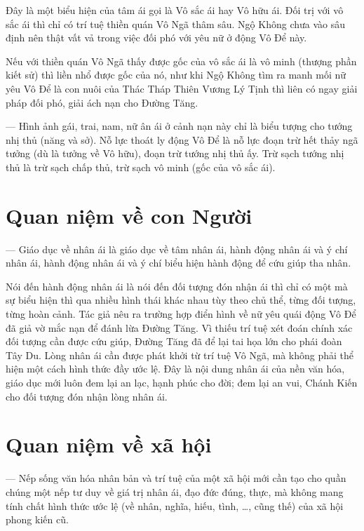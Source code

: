 Đây là một biểu hiện của tâm ái gọi là Vô sắc ái hay Vô hữu ái. Đối trị với vô sắc ái thì chỉ có trí tuệ thiền quán Vô Ngã thâm sâu. Ngộ Không chưa vào sâu định nên thật vất vả trong việc đối phó với yêu nữ ở động Vô Để này.

Nếu với thiền quán Vô Ngã thấy được gốc của vô sắc ái là vô minh (thượng phần kiết sử) thì liền nhổ được gốc của nó, như khi Ngộ Không tìm ra manh mối nữ yêu Vô Để là con nuôi của Thác Tháp Thiên Vương Lý Tịnh thì liên có ngay giải pháp đối phó, giải ách nạn cho Đường Tăng.

— Hình ảnh gái, trai, nam, nữ ân ái ở cảnh nạn này chỉ là biểu tượng cho tướng nhị thủ (năng và sở). Nỗ lực thoát ly động Vô Để là nỗ lực đoạn trừ hết thảy ngã tưởng (dù là tưởng về Vô hữu), đoạn trừ tướng nhị thủ ấy. Trừ sạch tướng nhị thủ là trừ sạch chấp thủ, trừ sạch vô minh (gốc của vô sắc ái).

\section{Quan niệm về con Người} %
\label{sec:80_81_con_nguoi}

— Giáo dục về nhân ái là giáo dục về tâm nhân ái, hành động nhân ái và ý chí nhân ái, hành động nhân ái và ý chí biểu hiện hành động để cứu giúp tha nhân.

Nói đến hành động nhân ái là nói đến đối tượng đón nhận ái thì chỉ có một mà sự biểu hiện thì qua nhiều hình thái khác nhau tùy theo chủ thể, từng đối tượng, từng hoàn cảnh. Tác giả nêu ra trường hợp điển hình về nữ yêu quái động Vô Để đã giả vờ mắc nạn để đánh lừa Đường Tăng. Vì thiếu trí tuệ xét đoán chính xác đối tượng cần được cứu giúp, Đường Tăng đã để lại tai họa lớn cho phái đoàn Tây Du. Lòng nhân ái cần được phát khởi từ trí tuệ Vô Ngã, mà không phải thể hiện một cách hình thức đầy ước lệ. Đây là nội dung nhân ái của nền văn hóa, giáo dục mới luôn đem lại an lạc, hạnh phúc cho đời; đem lại an vui, Chánh Kiến cho đối tượng đón nhận lòng nhân ái.

\section{Quan niệm về xã hội} %
\label{sec:80_81_xa_hoi}

— Nếp sống văn hóa nhân bản và trí tuệ của một xã hội mới cần tạo cho quần chúng một nếp tư duy về giá trị nhân ái, đạo đức đúng, thực, mà không mang tính chất hình thức ước lệ (về nhân, nghĩa, hiếu, tình, \ldots, cũng thế) của xã hội phong kiến cũ.

